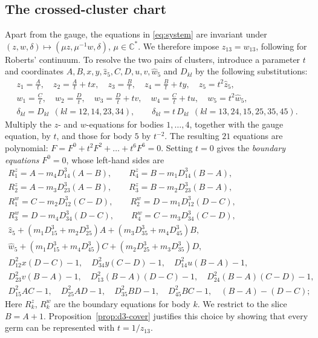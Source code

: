 \documentclass[Threeside,11pt]{article}
\theoremstyle{definition}
\theoremstyle{remark}
\numberwithin{equation}{section}
\newcommand{\C}{\mathbb C}\newcommand{\T}{\mathbb T}
\theoremstyle{remark}
\begin{document}
\subsection{The crossed-cluster chart}
{Apart from the gauge, the equations in \eqref{eq:system} are invariant under
$(z,w,\delta)\mapsto(\mu z,\mu^{-1}w,\delta)$, $\mu\in\C^*$. We therefore impose
$z_{13}=w_{13}$, following \cite[p.~543]{AK} for Roberts' continuum. To resolve the two pairs
of clusters, introduce a parameter $t$ and coordinates $A,B,x,y,\hat z_5,C,D,u,v,\hat w_5$ and $D_{kl}$
by the following substitutions:}
\begin{equation*}
\begin{gathered}
z_1=\tfrac{A}{t},\quad z_2=\tfrac{A}{t}+tx,\quad z_3=\tfrac{B}{t},\quad z_4=\tfrac{B}{t}+ty,
\quad z_5=t^2\hat z_5,\\
w_1=\tfrac{C}{t},\quad w_2=\tfrac{D}{t},\quad w_3=\tfrac{D}{t}+tv,\quad w_4=\tfrac{C}{t}+tu,
\quad w_5=t^2\hat w_5,\\
\delta_{kl}=D_{kl}\ \ (kl=12,14,23,34),\qquad
\delta_{kl}=t\,D_{kl}\ \ (kl=13,24,15,25,35,45).
\end{gathered}
\end{equation*}
{Multiply the $z$- and $w$-equations for bodies $1,\dots,4$, together with the gauge
equation, by $t$, and those for body $5$ by $t^{-2}$. The resulting $21$ equations are polynomial:
$F=F^0+t^2F^2+\dots+t^6F^6=0$.
Setting $t=0$ gives the \emph{boundary equations} $F^0=0$, whose left-hand sides are}
\begin{equation}\label{eq:d3-boundary}
\begin{gathered}
R^z_1=A-m_4D_{14}^3(A-B),\qquad R^z_4=B-m_1D_{14}^3(B-A),\\
R^z_2=A-m_3D_{23}^3(A-B),\qquad R^z_3=B-m_2D_{23}^3(B-A),\\
R^w_1=C-m_2D_{12}^3(C-D),\qquad R^w_2=D-m_1D_{12}^3(D-C),\\
R^w_3=D-m_4D_{34}^3(D-C),\qquad R^w_4=C-m_3D_{34}^3(C-D),\\
\hat z_5+(m_1D_{15}^3+m_2D_{25}^3)A+(m_3D_{35}^3+m_4D_{45}^3)B,\\
\hat w_5+(m_1D_{15}^3+m_4D_{45}^3)C+(m_2D_{25}^3+m_3D_{35}^3)D,\\
D_{12}^2x(D-C)-1,\quad D_{34}^2y(C-D)-1,\quad D_{14}^2u(B-A)-1,\\
D_{23}^2v(B-A)-1,\quad D_{13}^2(B-A)(D-C)-1,\quad D_{24}^2(B-A)(C-D)-1,\\
D_{15}^2AC-1,\quad D_{25}^2AD-1,\quad D_{35}^2BD-1,\quad D_{45}^2BC-1,\quad (B-A)-(D-C);
\end{gathered}
\end{equation}
{Here $R^z_k$, $R^w_k$ are the boundary equations for body $k$.
We restrict to the slice $B=A+1$. Proposition~\ref{prop:d3-cover} justifies this choice
by showing that every germ can be represented with $t=1/z_{13}$.}
\end{document}

